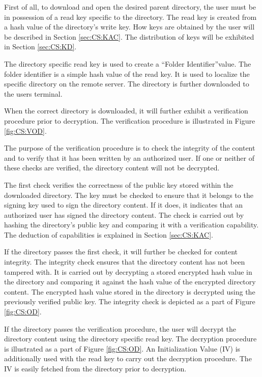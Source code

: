 \documentclass[english,12pt,a4paper]{book}
\begin{document}
First of all, to download and open the desired parent directory, the user must be in
possession of a read key specific to the directory. The read key is created from 
a hash value of the directory's write key. How keys are obtained by the 
user will be described in Section \ref{sec:CS:KAC}. The distribution of keys will be
exhibited in Section \ref{sec:CS:KD}.

The directory specific read key is used to create a ``Folder Identifier''value.
The folder identifier is a simple hash value of the read key. It is used to
localize the specific directory on the remote server. The directory is further
downloaded to the users terminal. 

When the correct directory is downloaded, it will further exhibit a verification
procedure prior to decryption. The verification procedure is illustrated in
Figure \ref{fig:CS:VOD}.

The purpose of the verification procedure is to check the integrity of the
content and to verify that it has been written by an authorized user. 
If one or neither of these checks are verified, the directory content will not
be decrypted.

The first check verifies the correctness of the public key stored within the 
downloaded directory. The key must be checked to ensure that it belongs to the signing
key used to sign the directory content. If it does, it indicates that an
authorized user has signed the directory content. The check is carried out by
hashing the directory's public key and comparing it with a verification
capability. The deduction of capabilities is explained in Section \ref{sec:CS:KAC}.

If the directory passes the first check, it will further be checked for content
integrity. The integrity check ensures that the directory content has not been
tampered with. It is carried out by decrypting a stored encrypted hash value in the
directory and comparing it against the hash value of the encrypted directory
content. The encrypted hash value stored in the directory is decrypted using the
previously verified public key. The integrity check is depicted as a part of Figure
\ref{fig:CS:OD}.

If the directory passes the verification procedure, the user will decrypt the
directory content using the directory specific read key. The decryption procedure
is illustrated as a part of Figure \ref{fig:CS:OD}. An Initialization Value (IV) is
additionally used with the read key to carry out the decryption procedure. The
IV is easily fetched from the directory prior to decryption.
\end{document}
